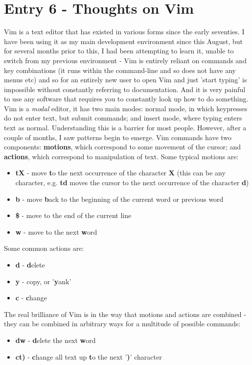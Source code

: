 \documentclass{article}
\begin{document}
\section*{Entry 6 - Thoughts on Vim}

\noindent Vim is a text editor that has existed in various forms since the early seventies. I have been using it as my main development environment since this August, but for several months prior to this, I had been attempting to learn it, unable to switch from my previous environment - Vim is entirely reliant on commands and key combinations (it runs within the command-line and so does not have any menus etc) and so for an entirely new user to open Vim and just 'start typing' is impossible without constantly referring to documentation. And it is very painful to use any software that requires you to constantly look up how to do something. Vim is a \emph{modal} editor, it has two main modes: normal mode, in which keypresses do not enter text, but submit commands; and insert mode, where typing enters text as normal. Understanding this is a barrier for most people. However, after a couple of months, I saw patterns begin to emerge. Vim commands have two components: \textbf{motions}, which correspond to some movement of the cursor; and \textbf{actions}, which correspond to manipulation of text. Some typical motions are:
\begin{itemize}
    \item \textbf{tX} - move \textbf{t}o the next occurrence of the character \textbf{X} (this can be any character, e.g. \textbf{td} moves the cursor to the next occurrence of the character \textbf{d})
    \item \textbf{b} - move \textbf{b}ack to the beginning of the current word or previous word
    \item \textbf{\$} - move to the end of the current line
    \item \textbf{w} - move to the next \textbf{w}ord
\end{itemize}
Some common actions are:
\begin{itemize}
    \item \textbf{d} - \textbf{d}elete
    \item \textbf{y} - copy, or '\textbf{y}ank'
    \item \textbf{c} - \textbf{c}hange
\end{itemize}
The real brilliance of Vim is in the way that motions and actions are combined - they can be combined in arbitrary ways for a multitude of possible commands:
\begin{itemize}
    \item \textbf{dw} - \textbf{d}elete the next \textbf{w}ord
    \item \textbf{ct)} - \textbf{c}hange all text up \textbf{t}o the next '\textbf{)}' character
\end{itemize}
\end{document}

